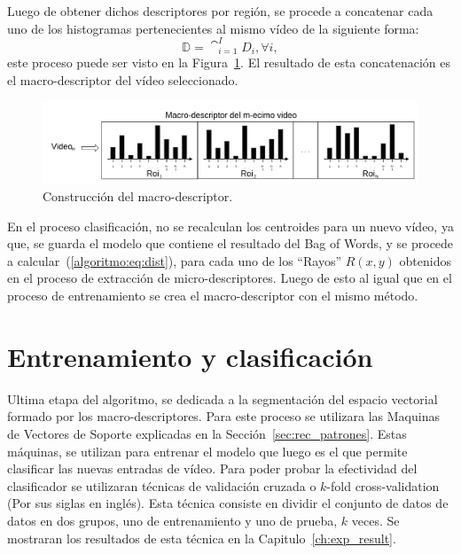 	
	Luego de obtener dichos descriptores por región, se procede a concatenar cada uno de los histogramas pertenecientes al mismo vídeo de la siguiente forma:
	\begin{equation}
		\mathds{D} = \cat_{i = 1}^{I} D_i, \forall i,
	\end{equation}	   
   este proceso puede ser visto en la Figura~\ref{algoritmo:fig:macro-descriptores}. El resultado de esta concatenación es el macro-descriptor del vídeo seleccionado.
	\begin{figure}[bt]
		\centering
  		\label{algoritmo:fig:macro-descriptores}
    		\includegraphics[width=1\textwidth]{Figuras/Diagramas/macro-descriptor.png}
  		\caption{Construcción del macro-descriptor.}
	\end{figure}	

	En el proceso clasificación, no se recalculan los centroides para un nuevo vídeo, ya que, se guarda el modelo que contiene el resultado del Bag of Words, y se procede a calcular~(\ref{algoritmo:eq:dist}), para cada uno de los ``Rayos'' $R(x,y)$ obtenidos en el proceso de extracción de micro-descriptores. Luego de esto al igual que en el proceso de entrenamiento se crea el macro-descriptor con el mismo método.
	
	
\section{Entrenamiento y clasificación}
\label{sec:clasificacion}
Ultima etapa del algoritmo, se dedicada a la segmentación del espacio vectorial formado por los macro-descriptores. Para este proceso se utilizara las Maquinas de Vectores de Soporte explicadas en la Sección~\ref{sec:rec_patrones}. Estas máquinas, se utilizan para entrenar el modelo que luego es el que permite clasificar las nuevas entradas de vídeo. 
Para poder probar la efectividad del clasificador se utilizaran técnicas de validación cruzada o $k$-fold cross-validation (Por sus siglas en inglés). Esta técnica consiste en dividir el conjunto de datos de datos en dos grupos, uno de entrenamiento y uno de prueba, $k$ veces. Se mostraran los resultados de esta técnica en la Capitulo~\ref{ch:exp_result}.


